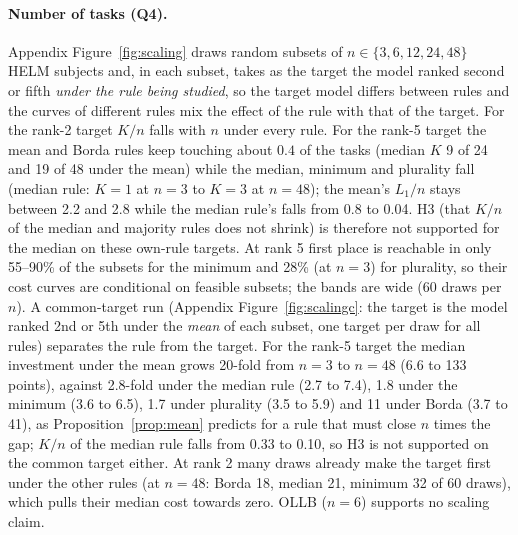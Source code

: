 \documentclass{article}
\begin{document}
\paragraph{Number of tasks (Q4).}
Appendix Figure~\ref{fig:scaling} draws random subsets of $n\in\{3,6,12,24,48\}$ HELM subjects and, in each subset, takes as the target the model ranked second or fifth \emph{under the rule being studied}, so the target model differs between rules and the curves of different rules mix the effect of the rule with that of the target. For the rank-2 target $K/n$ falls with $n$ under every rule. For the rank-5 target the mean and Borda rules keep touching about $0.4$ of the tasks (median $K$ 9 of 24 and 19 of 48 under the mean) while the median, minimum and plurality fall (median rule: $K=1$ at $n=3$ to $K=3$ at $n=48$); the mean's $L_1/n$ stays between 2.2 and 2.8 while the median rule's falls from 0.8 to 0.04. H3 (that $K/n$ of the median and majority rules does not shrink) is therefore not supported for the median on these own-rule targets. At rank 5 first place is reachable in only 55--90\% of the subsets for the minimum and 28\% (at $n=3$) for plurality, so their cost curves are conditional on feasible subsets; the bands are wide (60 draws per $n$). A common-target run (Appendix Figure~\ref{fig:scalingc}: the target is the model ranked 2nd or 5th under the \emph{mean} of each subset, one target per draw for all rules) separates the rule from the target. For the rank-5 target the median investment under the mean grows 20-fold from $n=3$ to $n=48$ (6.6 to 133 points), against 2.8-fold under the median rule (2.7 to 7.4), 1.8 under the minimum (3.6 to 6.5), 1.7 under plurality (3.5 to 5.9) and 11 under Borda (3.7 to 41), as Proposition~\ref{prop:mean} predicts for a rule that must close $n$ times the gap; $K/n$ of the median rule falls from 0.33 to 0.10, so H3 is not supported on the common target either. At rank 2 many draws already make the target first under the other rules (at $n=48$: Borda 18, median 21, minimum 32 of 60 draws), which pulls their median cost towards zero. OLLB ($n=6$) supports no scaling claim.
\end{document}
